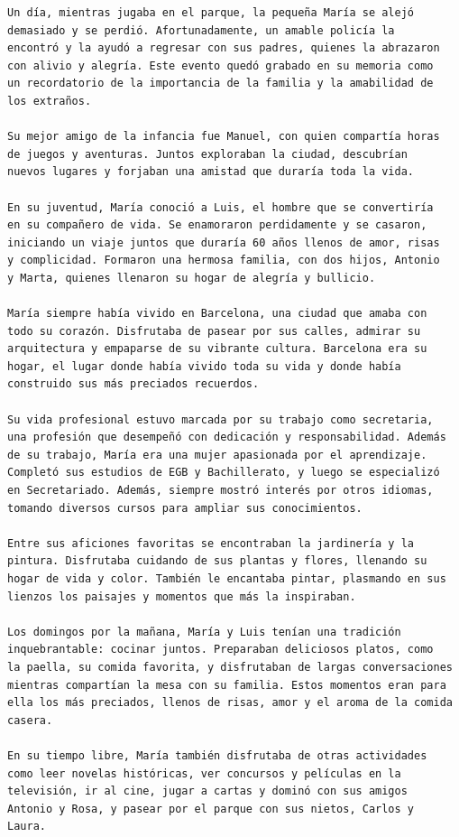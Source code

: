 \begin{verbatim}
Un día, mientras jugaba en el parque, la pequeña María se alejó  
demasiado y se perdió. Afortunadamente, un amable policía la  
encontró y la ayudó a regresar con sus padres, quienes la abrazaron  
con alivio y alegría. Este evento quedó grabado en su memoria como  
un recordatorio de la importancia de la familia y la amabilidad de  
los extraños.  

Su mejor amigo de la infancia fue Manuel, con quien compartía horas  
de juegos y aventuras. Juntos exploraban la ciudad, descubrían  
nuevos lugares y forjaban una amistad que duraría toda la vida.  

En su juventud, María conoció a Luis, el hombre que se convertiría  
en su compañero de vida. Se enamoraron perdidamente y se casaron,  
iniciando un viaje juntos que duraría 60 años llenos de amor, risas  
y complicidad. Formaron una hermosa familia, con dos hijos, Antonio  
y Marta, quienes llenaron su hogar de alegría y bullicio.  

María siempre había vivido en Barcelona, una ciudad que amaba con  
todo su corazón. Disfrutaba de pasear por sus calles, admirar su  
arquitectura y empaparse de su vibrante cultura. Barcelona era su  
hogar, el lugar donde había vivido toda su vida y donde había  
construido sus más preciados recuerdos.  

Su vida profesional estuvo marcada por su trabajo como secretaria,  
una profesión que desempeñó con dedicación y responsabilidad. Además  
de su trabajo, María era una mujer apasionada por el aprendizaje.  
Completó sus estudios de EGB y Bachillerato, y luego se especializó  
en Secretariado. Además, siempre mostró interés por otros idiomas,  
tomando diversos cursos para ampliar sus conocimientos.  

Entre sus aficiones favoritas se encontraban la jardinería y la  
pintura. Disfrutaba cuidando de sus plantas y flores, llenando su  
hogar de vida y color. También le encantaba pintar, plasmando en sus  
lienzos los paisajes y momentos que más la inspiraban.  

Los domingos por la mañana, María y Luis tenían una tradición  
inquebrantable: cocinar juntos. Preparaban deliciosos platos, como  
la paella, su comida favorita, y disfrutaban de largas conversaciones  
mientras compartían la mesa con su familia. Estos momentos eran para  
ella los más preciados, llenos de risas, amor y el aroma de la comida  
casera.  

En su tiempo libre, María también disfrutaba de otras actividades  
como leer novelas históricas, ver concursos y películas en la  
televisión, ir al cine, jugar a cartas y dominó con sus amigos  
Antonio y Rosa, y pasear por el parque con sus nietos, Carlos y  
Laura.  


\end{verbatim}
